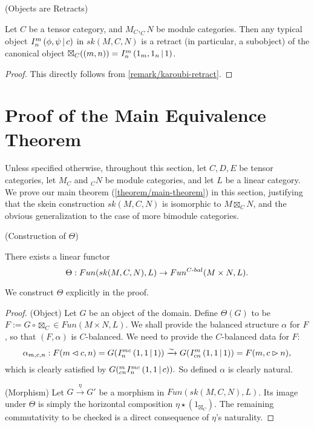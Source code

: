 \begin{lemma}\label{lemma/I-provides-subobject} (Objects are Retracts)

  \noindent Let $C$ be a tensor category, and $M_{C}, _{C}N$ be module
  categories. \quad Then any typical object ${}^{}_{} I^{m}_{n} \left( \phi, \psi \,\middle|\, c \right)$ in
  $sk(M,C,N)$ is a retract (in particular, a subobject) of the canonical
  object $\boxtimes_{C}((m,n)) = {}^{}_{} I^{m}_{n} \left( 1_{m}, 1_{n} \,\middle|\, 1 \right)$.
\end{lemma}
\begin{proof}
  This directly follows from \ref{remark/karoubi-retract}.
\end{proof}

\section{Proof of the Main Equivalence Theorem}\label{section/proof-of-equivalence}

Unless specified otherwise, throughout this section, let $C, D, E$ be tensor
categories, let $M_{C}$ and $_{C}N$ be module categories, and let $L$ be a
linear category. We prove our main theorem (\ref{theorem/main-theorem}) in this section, justifying
that the skein construction $sk(M,C,N)$ is isomorphic to $M \boxtimes_{C} N$, and the
obvious generalization to the case of more bimodule categories.

\begin{lemma}\label{lemma/construction-of-theta} (Construction of $\Theta$)

  \noindent There exists a linear functor
  \[
    \Theta: Fun(sk(M,C,N), L) \to Fun^{C{\text -}bal}(M \times N, L).
  \]
\end{lemma}

\noindent We construct $\Theta$ explicitly in the proof.

\begin{proof}
  \noindent (Object) Let $G$ be an object of the domain. Define $\Theta(G)$ to
  be $F := G \circ \boxtimes_{C} \in Fun(M \times N, L)$. We shall provide the
  balanced structure $\alpha$ for $F$, so that $(F, \alpha)$ is $C$-balanced. 
  We need to provide the $C$-balanced data for $F$:
  \[
    \alpha_{m,c,n}: F(m \lhd c, n) =
    G({}^{}_{} I^{mc}_{n} \left( 1, 1 \,\middle|\, 1 \right))
    \xrightarrow{\sim} G({}^{}_{} I^{m}_{cn} \left( 1, 1 \,\middle|\, 1 \right))
    = F(m, c \rhd n),
  \]
  which is clearly satisfied by $G({}^{m}_{cn} I^{mc}_{n} \left( 1, 1 \,\middle|\, c \right)).$ So defined
  $\alpha$ is clearly natural.

  \noindent (Morphism) Let $G \xrightarrow{\eta} G'$ be a morphism in
  $Fun(sk(M,C,N), L)$. Its image under $\Theta$ is simply the horizontal
  composition $\eta \star (1_{\boxtimes_{C}})$. The remaining commutativity to be checked
  is a direct consequence of $\eta$'s naturality.
\end{proof}

